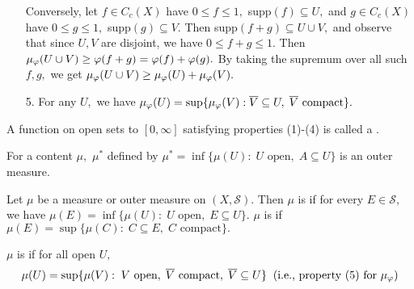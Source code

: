 \begin{frame*}
\begin{enumerate}
{	Conversely, let $f\in C_c(X)$ have $0\leq f\leq 1,$ supp$(f)\subseteq U,$ and $g\in C_c(X)$ have $0\leq g\leq 1,$ supp$(g)\subseteq V.$ Then supp$(f+g)\subseteq U\cup V,$ and observe that since $U,V$ are disjoint, we have $0\leq f+g\leq 1.$ Then $\mu_{\varphi}(U\cup V)\geq\varphi(f+g)=\varphi(f)+\varphi(g).$ By taking the supremum over all such $f,g,$ we get $\mu_{\varphi}(U\cup V)\geq\mu_{\varphi}(U)+\mu_{\varphi}(V).$
}
\item[5.] For any $U,$ we have $\mu_{\varphi}(U)=\sup\{\mu_{\varphi}(V):\overline{V}\subseteq U,\;\overline{V}\text{ compact}\}.$ \\
\end{enumerate}
\end{frame*}

\begin{defn}
A function on open sets to $[0,\infty]$ satisfying properties (1)-(4) is called a .
\end{defn}

\begin{prop}
For a content $\mu,$ $\mu^*$ defined by $\mu^*=\inf\{\mu(U):\;U\text{ open},\; A\subseteq U\}$ is an outer measure.\\
\end{prop}

\begin{defn}
Let $\mu$ be a measure or outer measure on $(X,\mathcal{S}).$ Then $\mu$ is  if for every $E\in\mathcal{S},$ we have $\mu(E)=\inf\{\mu(U):\;U\text{ open},\; E\subseteq U\}.$ $\mu$ is  if $\mu(E)=\sup\{\mu(C):\;C\subseteq E,\;C\text{ compact}\}.$
\end{defn}

\begin{defn}
$\mu$ is  if for all open $U,$
$$\mu(U)=\sup\{\mu(V):\;V\text{ open},\;\overline{V}\text{ compact},\;\overline{V}\subseteq U\}\;\; \text{(i.e., property (5) for $\mu_{\varphi}$)}$$
\end{defn}

